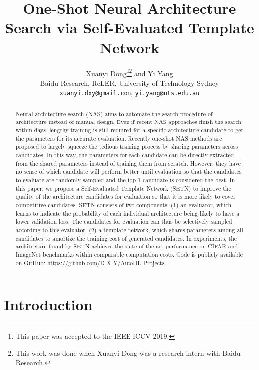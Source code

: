 \documentclass[10pt,twocolumn,letterpaper]{article}
\def\NAME{{SETN}}
\begin{document}
\title{One-Shot Neural Architecture Search via Self-Evaluated Template Network}

\author{
Xuanyi Dong\thanks{This paper was accepted to the IEEE ICCV 2019.}\thanks{This work was done when Xuanyi Dong was a research intern with Baidu Research.} and Yi Yang \\
Baidu Research, ReLER, University of Technology Sydney\\
{\tt\small xuanyi.dxy@gmail.com}, {\tt\small yi.yang@uts.edu.au}
}

\maketitle
\ificcvfinal\thispagestyle{empty}\fi


\begin{abstract}
Neural architecture search (NAS) aims to automate the search procedure of architecture instead of manual design. Even if recent NAS approaches finish the search within days, lengthy training is still required for a specific architecture candidate to get the parameters for its accurate evaluation. Recently one-shot NAS methods are proposed to largely squeeze the tedious training process by sharing parameters across candidates. In this way, the parameters for each candidate can be directly extracted from the shared parameters instead of training them from scratch. However, they have no sense of which candidate will perform better until evaluation so that the candidates to evaluate are randomly sampled and the top-1 candidate is considered the best. In this paper, we propose a Self-Evaluated Template Network ({\NAME}) to improve the quality of the architecture candidates for evaluation so that it is more likely to cover competitive candidates. {\NAME} consists of two components: (1) an evaluator, which learns to indicate the probability of each individual architecture being likely to have a lower validation loss. The candidates for evaluation can thus be selectively sampled according to this evaluator. (2) a template network, which shares parameters among all candidates to amortize the training cost of generated candidates. In experiments, the architecture found by {\NAME} achieves the state-of-the-art performance on CIFAR and ImageNet benchmarks within comparable computation costs. Code is publicly available on GitHub: \url{https://github.com/D-X-Y/AutoDL-Projects}.
\end{abstract}



\section{Introduction}
\end{document}
